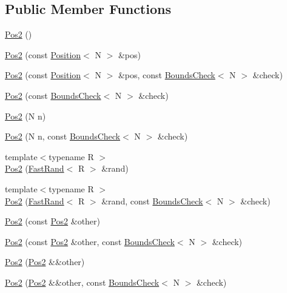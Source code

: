 \subsection*{Public Member Functions}
\begin{DoxyCompactItemize}
\item 
\hyperlink{struct_pos2_af66901093e4a4ed4af0315a5555df3ff}{Pos2} ()
\item 
\hyperlink{struct_pos2_a34523a174500233d5f7222928e6fd1f1}{Pos2} (const \hyperlink{struct_position}{Position}$<$ N $>$ \&pos)
\item 
\hyperlink{struct_pos2_ae366b3cb5f89bda2a574490caddc2320}{Pos2} (const \hyperlink{struct_position}{Position}$<$ N $>$ \&pos, const \hyperlink{struct_bounds_check}{Bounds\-Check}$<$ N $>$ \&check)
\item 
\hyperlink{struct_pos2_aa272160e1bdc4cc04a2cb19351acf2dc}{Pos2} (const \hyperlink{struct_bounds_check}{Bounds\-Check}$<$ N $>$ \&check)
\item 
\hyperlink{struct_pos2_ae85aa637e77fc1c30b98eee7884f677a}{Pos2} (N n)
\item 
\hyperlink{struct_pos2_a746cc704e8b447b9f8e0037df6b704ba}{Pos2} (N n, const \hyperlink{struct_bounds_check}{Bounds\-Check}$<$ N $>$ \&check)
\item 
{\footnotesize template$<$typename R $>$ }\\\hyperlink{struct_pos2_a8c12e1e032bae75160901b5a59acd86f}{Pos2} (\hyperlink{class_fast_rand}{Fast\-Rand}$<$ R $>$ \&rand)
\item 
{\footnotesize template$<$typename R $>$ }\\\hyperlink{struct_pos2_ad763268dd2c65d60f0279b55f4079d31}{Pos2} (\hyperlink{class_fast_rand}{Fast\-Rand}$<$ R $>$ \&rand, const \hyperlink{struct_bounds_check}{Bounds\-Check}$<$ N $>$ \&check)
\item 
\hyperlink{struct_pos2_a6b88fd90d4b9173a4d95f8f91484f3fd}{Pos2} (const \hyperlink{struct_pos2}{Pos2} \&other)
\item 
\hyperlink{struct_pos2_aa35a42de65893664396cc6a584d3a936}{Pos2} (const \hyperlink{struct_pos2}{Pos2} \&other, const \hyperlink{struct_bounds_check}{Bounds\-Check}$<$ N $>$ \&check)
\item 
\hyperlink{struct_pos2_a7b2614b7ddcf0c3f0a3bc591ae5480dc}{Pos2} (\hyperlink{struct_pos2}{Pos2} \&\&other)
\item 
\hyperlink{struct_pos2_a235c965af4114604aac09c036f08d3e8}{Pos2} (\hyperlink{struct_pos2}{Pos2} \&\&other, const \hyperlink{struct_bounds_check}{Bounds\-Check}$<$ N $>$ \&check)

\end{DoxyCompactItemize}
